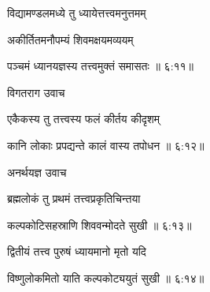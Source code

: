 {\devanagarifont विद्यामण्डलमध्ये तु ध्यायेत्तत्त्वमनुत्तमम् \thinspace{\dandab} \dontdisplaylinenum }%

{\devanagarifont अकीर्तितमनौपम्यं शिवमक्षयमव्ययम्  \danda\dontdisplaylinenum }%


{\devanagarifont पञ्चमं ध्यानयज्ञस्य तत्त्वमुक्तं समासतः {॥ ६:११॥} \veg\dontdisplaylinenum }%

{\devanagarifont विगतराग उवाच {\dandab}\dontdisplaylinenum  }%
 
{\devanagarifont एकैकस्य तु तत्त्वस्य फलं कीर्तय कीदृशम् \thinspace{\danda} \dontdisplaylinenum }%


{\devanagarifont कानि लोकाः प्रपद्यन्ते कालं वास्य तपोधन {॥ ६:१२॥} \veg\dontdisplaylinenum }%

{\devanagarifont अनर्थयज्ञ उवाच {\dandab}\dontdisplaylinenum  }%
 
{\devanagarifont ब्रह्मलोकं तु प्रथमं तत्त्वप्रकृतिचिन्तया \thinspace{\danda} \dontdisplaylinenum }%


{\devanagarifont कल्पकोटिसहस्राणि शिववन्मोदते सुखी {॥ ६:१३॥} \veg\dontdisplaylinenum }%

{\devanagarifont द्वितीयं तत्त्व पुरुषं ध्यायमानो मृतो यदि \thinspace{\dandab} \dontdisplaylinenum }%
 

{\devanagarifont विष्णुलोकमितो याति कल्पकोट्ययुतं सुखी {॥ ६:१४॥} \veg\dontdisplaylinenum }%

